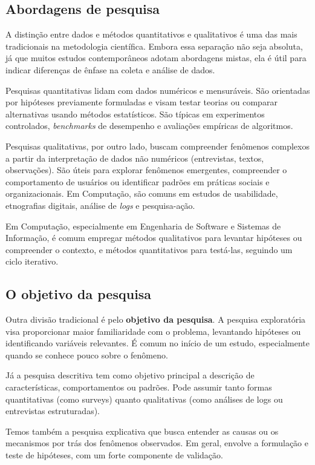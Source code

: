 \subsection{Abordagens de pesquisa}

A distinção entre dados e métodos quantitativos e qualitativos é uma das mais tradicionais na metodologia científica. 
Embora essa separação não seja absoluta, já que muitos estudos contemporâneos adotam abordagens mistas, ela é útil para indicar diferenças de ênfase na coleta e análise de dados.

Pesquisas quantitativas lidam com dados numéricos e mensuráveis. São orientadas por hipóteses previamente formuladas e visam testar teorias ou comparar alternativas usando métodos estatísticos. São típicas em experimentos controlados, \textit{benchmarks} de desempenho e avaliações empíricas de algoritmos.

Pesquisas qualitativas, por outro lado, buscam compreender fenômenos complexos a partir da interpretação de dados não numéricos (entrevistas, textos, observações). 
São úteis para explorar fenômenos emergentes, compreender o comportamento de usuários ou identificar padrões em práticas sociais e organizacionais. 
Em Computação, são comuns em estudos de usabilidade, etnografias digitais, análise de \textit{logs} e pesquisa-ação.

Em Computação, especialmente em Engenharia de Software e Sistemas de Informação, é comum empregar métodos qualitativos para levantar hipóteses ou compreender o contexto, e métodos quantitativos para testá-las, seguindo um ciclo iterativo.

\subsection{O objetivo da pesquisa}

Outra divisão tradicional é pelo \textbf{objetivo da pesquisa}. A pesquisa exploratória visa proporcionar maior familiaridade com o problema, levantando hipóteses ou identificando variáveis relevantes. É comum no início de um estudo, especialmente quando se conhece pouco sobre o fenômeno.

Já a pesquisa descritiva tem como objetivo principal a descrição de características, comportamentos ou padrões. Pode assumir tanto formas quantitativas (como surveys) quanto qualitativas (como análises de logs ou entrevistas estruturadas).

Temos também a pesquisa explicativa que busca entender as causas ou os mecanismos por trás dos fenômenos observados. Em geral, envolve a formulação e teste de hipóteses, com um forte componente de validação.

